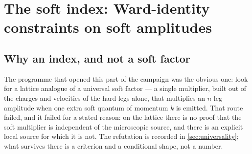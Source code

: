
\newcommand{\statusProposed}{\statustag{Plum}{proposed, not merged}}
\newcommand{\Aproto}{\mathcal{A}}        %
\newcommand{\Rproto}{\mathcal{R}}        %
\newcommand{\Hsec}{\mathcal{H}}          %
\newcommand{\rank}{\operatorname{rank}}  %

\section{The soft index: Ward-identity constraints on soft amplitudes}
\label{sec:soft-index}

\subsection{Why an index, and not a soft factor}

The programme that opened this part of the campaign was the obvious one: look
for a lattice analogue of a universal soft factor --- a single multiplier,
built out of the charges and velocities of the hard legs alone, that
multiplies an $n$-leg amplitude when one extra soft quantum of momentum $k$ is
emitted. That route failed, and it failed for a stated reason: on the lattice
there is no proof that the soft multiplier is independent of the microscopic
source, and there is an explicit local source for which it is not. The
refutation is recorded in \cref{sec:universality}; what survives there is a
criterion and a conditional shape, not a number.

